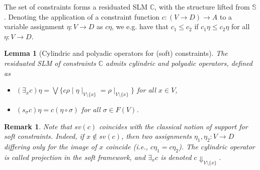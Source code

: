 \documentclass[preprint,12pt]{elsarticle}
\newtheorem{remark}{Remark}
\newtheorem{lemma}{Lemma}
\begin{document}
The set of constraints forms a residuated SLM $\mathbb{C}$, with the structure
lifted from ${\mathbb S}$. Denoting the application of a
constraint function $c:(V \rightarrow D) \rightarrow A$ to a variable
assignment $\eta:V\rightarrow D$ as $c\eta$, we e.g. have that 
$c_1 \leq c_2$ if $c_1\eta\leq c_2\eta$ for all $\eta: V \rightarrow D$.

\begin{lemma}[Cylindric and polyadic operators for (soft) constraints]
	The residuated SLM of constraints $\mathbb{C}$ admits cylindric and polyadic operators, defined as
	\begin{itemize}
		\item  $(\exists_x c) \eta = \bigvee \{c \rho \mid \eta\mid_{V \setminus \{x\}} = 
		\rho\mid_{V \setminus \{x\}}\}$ for all $x \in V$,
		\item  $(s_\sigma c) \eta = c (\eta \circ \sigma)$ for all $\sigma \in F(V)$.
	\end{itemize}
\end{lemma}

\begin{remark}
	Note that $sv(c)$ coincides with the classical notion of support
	for soft constraints. Indeed, if $x\not \in sv(c)$, then two
	assignments $\eta_1, \eta_2: V \rightarrow D$ differing only for the
	image of $x$ coincide (i.e., $c\eta_1 =
	c\eta_2$).
	The cylindric operator is called \emph{projection} 
	in the soft framework, and $\exists_x c$ is denoted 
	$c\Downarrow_{V\setminus \{x\}}$.
\end{remark}
\end{document}
